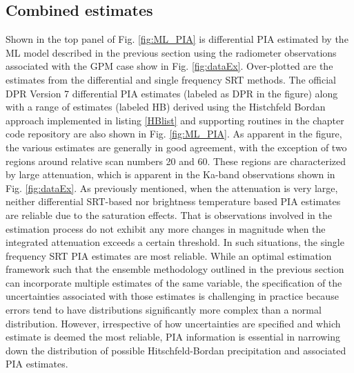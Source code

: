 \documentclass[10pt]{ietbook}
\begin{document}
\subsection{Combined estimates}
Shown in the top panel of Fig. \ref{fig:ML_PIA} is differential PIA estimated by the ML model described in the previous
section using the radiometer observations associated with the GPM case show in Fig. \ref{fig:dataEx}. Over-plotted are 
the estimates from the differential and single frequency SRT methods.  The official DPR Version 7 differential PIA 
estimates (labeled as DPR in the figure) along with a range of estimates (labeled HB) derived using the Histchfeld Bordan 
approach implemented in listing \ref{HBlist}
and supporting routines in the chapter code repository are also shown in Fig. \ref{fig:ML_PIA}. As apparent in the figure,
the various estimates are generally in good agreement, with the exception of two regions around relative scan numbers 20 and 60.
These regions are characterized by large attenuation, which is apparent in the Ka-band observations shown in
Fig. \ref{fig:dataEx}. As previously mentioned, when the attenuation is very large, neither differential SRT-based 
nor brightness temperature based PIA estimates are reliable due to the saturation effects.  That is observations involved
in the estimation process do not exhibit any more changes in magnitude when the integrated attenuation exceeds a certain threshold.
In such situations, the single frequency SRT PIA estimates are most reliable. While an optimal estimation framework such
that the ensemble methodology outlined in the previous section can incorporate multiple estimates of the same variable,
the specification of the uncertainties associated with those estimates is challenging in practice because errors tend
to have distributions significantly more complex than a normal distribution. However, irrespective of how uncertainties
are specified and which estimate is deemed the most reliable, PIA information is essential in narrowing down the distribution 
of possible Hitschfeld-Bordan precipitation and associated PIA estimates.
\end{document}

